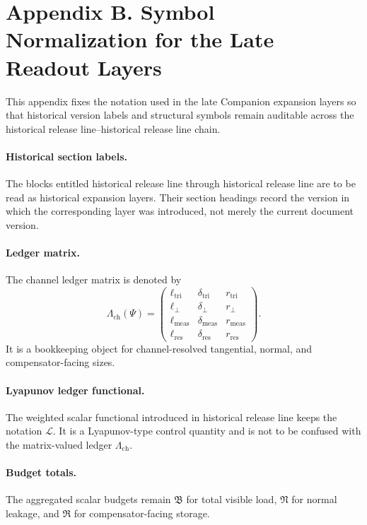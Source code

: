 \documentclass[12pt,a4paper]{article}
\DeclareRobustCommand{\QSCver}[1]{archival stage}
\renewcommand{\QSCver}[1]{historical release line}
\begin{document}

\section*{Appendix B. Symbol Normalization for the Late Readout Layers}

This appendix fixes the notation used in the late Companion expansion layers so that
historical version labels and structural symbols remain auditable across the \QSCver{v2.4.0}--\QSCver{v2.11.0}
chain.

\paragraph{Historical section labels.}
The blocks entitled \QSCver{v2.4.0} through \QSCver{v2.11.0} are to be read as historical expansion
layers. Their section headings record the version in which the corresponding layer was
introduced, not merely the current document version.

\paragraph{Ledger matrix.}
The channel ledger matrix is denoted by
\[
\Lambda_{\mathrm{ch}}(\Psi)
=
\begin{pmatrix}
\ell_{\mathrm{tri}} & \delta_{\mathrm{tri}} & r_{\mathrm{tri}}\\
\ell_{\perp} & \delta_{\perp} & r_{\perp}\\
\ell_{\mathrm{meas}} & \delta_{\mathrm{meas}} & r_{\mathrm{meas}}\\
\ell_{\mathrm{res}} & \delta_{\mathrm{res}} & r_{\mathrm{res}}
\end{pmatrix}.
\]
It is a bookkeeping object for channel-resolved tangential, normal, and compensator-facing
sizes.

\paragraph{Lyapunov ledger functional.}
The weighted scalar functional introduced in \QSCver{v2.6.0} keeps the notation
\(\mathcal L\). It is a Lyapunov-type control quantity and is not to be confused with the
matrix-valued ledger \(\Lambda_{\mathrm{ch}}\).

\paragraph{Budget totals.}
The aggregated scalar budgets remain
\(\mathfrak B\) for total visible load, \(\mathfrak N\) for normal leakage, and
\(\mathfrak R\) for compensator-facing storage.
\end{document}
